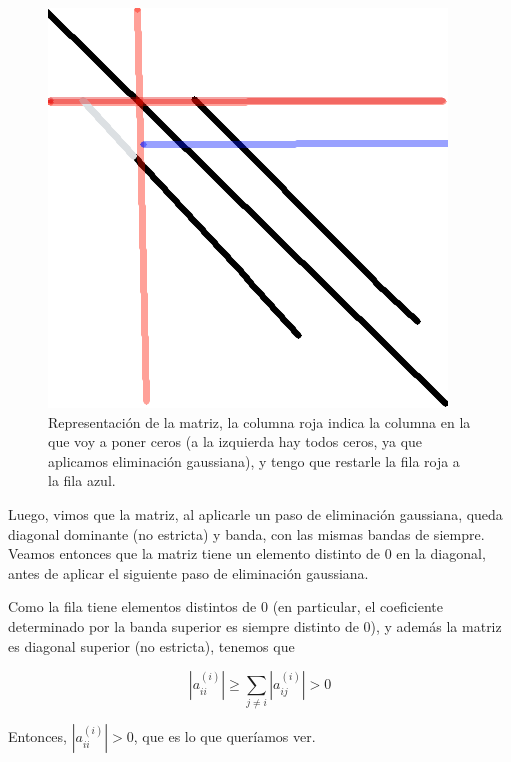 \begin{figure}[H]
    \begin{center}
\includegraphics[scale=0.3]{imgs/expl.png}
\end{center}
\caption{\footnotesize{Representación de la matriz, la columna roja indica la columna en la que voy a poner ceros (a la izquierda hay todos ceros, ya que aplicamos eliminación gaussiana), y tengo que restarle la fila roja a la fila azul.}}
 \end{figure}

Luego, vimos que la matriz, al aplicarle un paso de eliminación gaussiana, queda diagonal dominante (no estricta) y banda, con las mismas bandas de siempre. Veamos entonces que la matriz tiene un elemento distinto de 0 en la diagonal, antes de aplicar el siguiente paso de eliminación gaussiana.

Como la fila tiene elementos distintos de 0 (en particular, el coeficiente determinado por la banda superior es siempre distinto de 0), y además la matriz es diagonal superior (no estricta), tenemos que

\[
  |a_{ii}^{(i)}| \geq \sum_{j \neq i} |a_{ij}^{(i)}| > 0
\]

Entonces, $|a_{ii}^{(i)}| > 0$, que es lo que queríamos ver.


